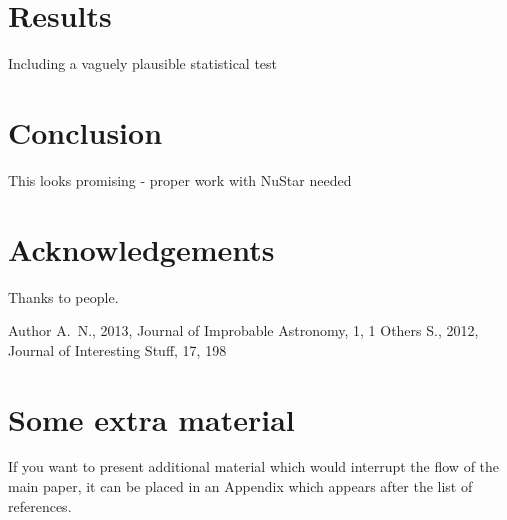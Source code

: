 \documentclass[a4paper,fleqn,usenatbib]{mnras}
\begin{document}
\section{Results}
Including a vaguely plausible statistical test

\section{Conclusion}
This looks promising - proper work with NuStar needed

\section*{Acknowledgements}
Thanks to people. 




%


\begin{thebibliography}{99}
Author A.~N., 2013, Journal of Improbable Astronomy, 1, 1
Others S., 2012, Journal of Interesting Stuff, 17, 198
\end{thebibliography}



\appendix

\section{Some extra material}

If you want to present additional material which would interrupt the flow of the main paper,
it can be placed in an Appendix which appears after the list of references.



\bsp	%
\label{lastpage}
\end{document}
